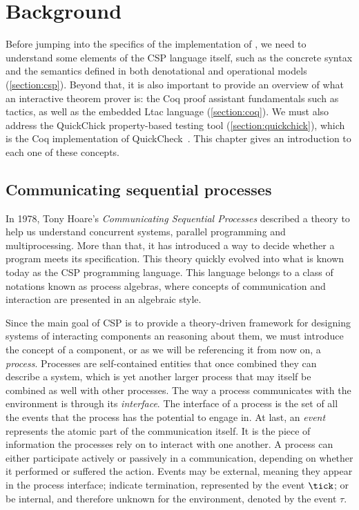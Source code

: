 \chapter{Background}
\label{chapter:background}

Before jumping into the specifics of the implementation of \CSPcoq{}, we need to understand some elements of the CSP language itself, such as the concrete syntax and the semantics defined in both denotational and operational models (\autoref{section:csp}). Beyond that, it is also important to provide an overview of what an interactive theorem prover is: the Coq proof assistant fundamentals such as tactics, as well as the embedded Ltac language (\autoref{section:coq}). We must also address the QuickChick property-based testing tool (\autoref{section:quickchick}), which is the Coq implementation of QuickCheck~\cite{hughes:quickcheck2000}. This chapter gives an introduction to each one of these concepts.

\section{Communicating sequential processes}
\label{section:csp}

In 1978, Tony Hoare's \emph{Communicating Sequential Processes} \cite{hoare:csp} described a theory to help us understand concurrent systems, parallel programming and multiprocessing. More than that, it has introduced a way to decide whether a program meets its specification. This theory quickly evolved into what is known today as the CSP programming language. This language belongs to a class of notations known as process algebras, where concepts of communication and interaction are presented in an algebraic style.

Since the main goal of CSP is to provide a theory-driven framework for designing systems of interacting components an reasoning about them, we must introduce the concept of a component, or as we will be referencing it from now on, a \emph{process}. Processes are self-contained entities that once combined they can describe a system, which is yet another larger process that may itself be combined as well with other processes. The way a process communicates with the environment is through its \emph{interface}. The interface of a process is the set of all the events that the process has the potential to engage in. At last, an \emph{event} represents the atomic part of the communication itself. It is the piece of information the processes rely on to interact with one another. A process can either participate actively or passively in a communication, depending on whether it performed or suffered the action. Events may be external, meaning they appear in the process interface; indicate termination, represented by the event $ \tick $; or be internal, and therefore unknown for the environment, denoted by the event $ \tau $.

